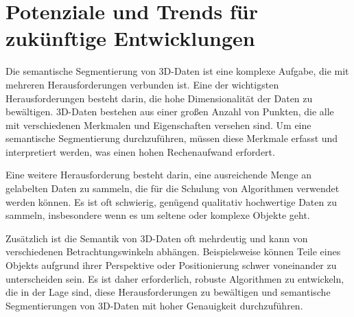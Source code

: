 \section{Potenziale und Trends für zukünftige Entwicklungen}
Die semantische Segmentierung von 3D-Daten ist eine komplexe Aufgabe, die mit
mehreren Herausforderungen verbunden ist. Eine der wichtigsten
Herausforderungen besteht darin, die hohe Dimensionalität der Daten zu
bewältigen. 3D-Daten bestehen aus einer großen Anzahl von Punkten, die alle mit
verschiedenen Merkmalen und Eigenschaften versehen sind. Um eine semantische
Segmentierung durchzuführen, müssen diese Merkmale erfasst und interpretiert
werden, was einen hohen Rechenaufwand erfordert.

Eine weitere Herausforderung besteht darin, eine ausreichende Menge an
gelabelten Daten zu sammeln, die für die Schulung von Algorithmen verwendet
werden können. Es ist oft schwierig, genügend qualitativ hochwertige Daten zu
sammeln, insbesondere wenn es um seltene oder komplexe Objekte geht.

Zusätzlich ist die Semantik von 3D-Daten oft mehrdeutig und kann von
verschiedenen Betrachtungswinkeln abhängen. Beispielsweise können Teile eines
Objekts aufgrund ihrer Perspektive oder Positionierung schwer voneinander zu
unterscheiden sein. Es ist daher erforderlich, robuste Algorithmen zu
entwickeln, die in der Lage sind, diese Herausforderungen zu bewältigen und
semantische Segmentierungen von 3D-Daten mit hoher Genauigkeit durchzuführen.